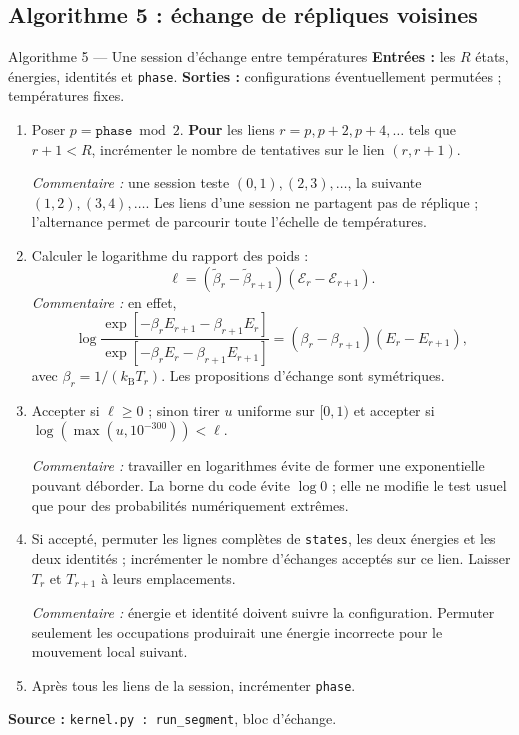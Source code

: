 \documentclass[10pt,a4paper]{article}
\newcommand{\kb}{k_{\mathrm B}}
\begin{document}
\subsection{Algorithme 5 : échange de répliques voisines}
\begin{algocode}{Algorithme 5 --- Une session d'échange entre températures}
\textbf{Entrées :} les $R$ états, énergies, identités et \texttt{phase}.
\textbf{Sorties :} configurations éventuellement permutées ; températures fixes.
\begin{enumerate}
\item Poser $p=\texttt{phase}\bmod2$. \textbf{Pour} les liens
$r=p,p+2,p+4,\ldots$ tels que $r+1<R$, incrémenter le nombre de tentatives
sur le lien $(r,r+1)$.
\par\textit{Commentaire :} une session teste $(0,1),(2,3),\ldots$, la
suivante $(1,2),(3,4),\ldots$. Les liens d'une session ne partagent pas de
réplique ; l'alternance permet de parcourir toute l'échelle de températures.
\item Calculer le logarithme du rapport des poids :
\[
\ell=(\widetilde\beta_r-\widetilde\beta_{r+1})
       (\mathcal E_r-\mathcal E_{r+1}).
\]
\textit{Commentaire :} en effet,
\[
\log\frac{\exp[-\beta_r E_{r+1}-\beta_{r+1}E_r]}
{\exp[-\beta_r E_r-\beta_{r+1}E_{r+1}]}
=(\beta_r-\beta_{r+1})(E_r-E_{r+1}),
\]
avec $\beta_r=1/(\kb T_r)$. Les propositions d'échange sont symétriques.
\item Accepter si $\ell\ge0$ ; sinon tirer $u$ uniforme sur $[0,1)$ et
accepter si $\log(\max(u,10^{-300}))<\ell$.
\par\textit{Commentaire :} travailler en logarithmes évite de former une
exponentielle pouvant déborder. La borne du code évite $\log0$ ; elle ne
modifie le test usuel que pour des probabilités numériquement extrêmes.
\item Si accepté, permuter les lignes complètes de \texttt{states}, les
deux énergies et les deux identités ; incrémenter le nombre d'échanges
acceptés sur ce lien. Laisser $T_r$ et $T_{r+1}$ à leurs emplacements.
\par\textit{Commentaire :} énergie et identité doivent suivre la
configuration. Permuter seulement les occupations produirait une énergie
incorrecte pour le mouvement local suivant.
\item Après tous les liens de la session, incrémenter \texttt{phase}.
\end{enumerate}
\textbf{Source :} \texttt{kernel.py : run\_segment}, bloc d'échange.
\end{algocode}
\end{document}
